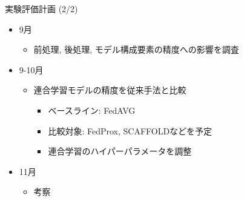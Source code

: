 \documentclass[unicode,12pt,aspectratio=169,dvipdfmx]{beamer}
\begin{document}
\begin{frame}{実験評価計画 (2/2)}
    \begin{itemize}
        \item 9月
        \begin{itemize}
            \item 前処理, 後処理, モデル構成要素の精度への影響を調査
        \end{itemize}
        \item 9-10月
        \begin{itemize}
            \item 連合学習モデルの精度を従来手法と比較
            \begin{itemize}
                \item ベースライン: FedAVG
                \item 比較対象: FedProx, SCAFFOLDなどを予定
                \item 連合学習のハイパーパラメータを調整
            \end{itemize}
        \end{itemize}
        \item 11月
        \begin{itemize}
            \item 考察
        \end{itemize}
    \end{itemize}
\end{frame}

\end{document}
